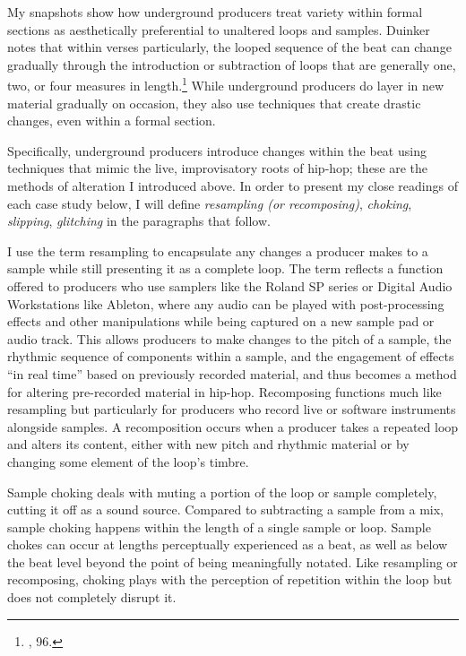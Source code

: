 My snapshots show how underground producers treat variety within formal sections as aesthetically preferential to unaltered loops and samples. Duinker notes that within verses particularly, the looped sequence of the beat can change gradually through the introduction or subtraction of loops that are generally one, two, or four measures in length.\footnote{\cite{benduinkerSongFormMainstreaming2020}, 96.} While underground producers do layer in new material gradually on occasion, they also use techniques that create drastic changes, even within a formal section. 

Specifically, underground producers introduce changes within the beat using techniques that mimic the live, improvisatory roots of hip-hop; these are the methods of alteration I introduced above. In order to present my close readings of each case study below, I will define \emph{resampling (or recomposing)}, \emph{choking}, \emph{slipping}, \emph{glitching} in the paragraphs that follow.

I use the term resampling to encapsulate any changes a producer makes to a sample while still presenting it as a complete loop. The term reflects a function offered to producers who use samplers like the Roland SP series or Digital Audio Workstations like Ableton, where any audio can be played with post-processing effects and other manipulations while being captured on a new sample pad or audio track. This allows producers to make changes to the pitch of a sample, the rhythmic sequence of components within a sample, and the engagement of effects ``in real time'' based on previously recorded material, and thus becomes a method for altering pre-recorded material in hip-hop. Recomposing functions much like resampling but particularly for producers who record live or software instruments alongside samples. A recomposition occurs when a producer takes a repeated loop and alters its content, either with new pitch and rhythmic material or by changing some element of the loop's timbre. 

Sample choking deals with muting a portion of the loop or sample completely, cutting it off as a sound source. Compared to subtracting a sample from a mix, sample choking happens within the length of a single sample or loop. Sample chokes can occur at lengths perceptually experienced as a beat, as well as below the beat level beyond the point of being meaningfully notated. Like resampling or recomposing, choking plays with the perception of repetition within the loop but does not completely disrupt it.

